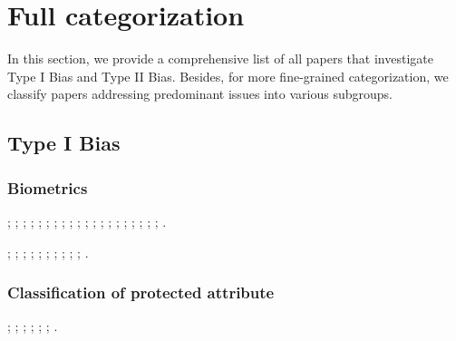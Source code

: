 \label{sec:related_work}


\section{Full categorization}
In this section, we provide a comprehensive list of all \pc papers that investigate Type I Bias and Type II Bias. 
Besides, for more fine-grained categorization, we classify papers addressing predominant issues into various subgroups.


\subsection{Type I Bias}

\subsubsection{Biometrics}
\cite{RL_RBN}; 
\cite{RFW_IMAN}; 
\cite{GAC}; 
\cite{MvCoM}; 
\cite{FPR_Penalty_Loss};
\cite{FairCal};
\cite{Asymmetric_Rejection_Loss};
\cite{inclusivefacenet};
\cite{debias_data_augmentation};
\cite{debias_balanced_AUCROC};
\cite{mcduff2019characterizing};
\cite{long2015learning};
\cite{dam};
\cite{dhar2020adversarial};
\cite{terhorst2020post};
\cite{Terhrst2020ComparisonLevelMO};
\cite{robinson2020face};
\cite{sensitive_loss};
\cite{CAT};
\cite{pahl2022female};
\cite{conti2024assessing}.




\noindent
{}
\cite{FR_inherent_bias};
\cite{pass};
\cite{DebFace};
\cite{SensitiveNets};
\cite{personalization};
\cite{class_imbalance_long_tail}; 
\cite{albiero2020face};
\cite{cavazos2020accuracy};
\cite{han2017heterogeneous};
\cite{nagpal2019deep};
\cite{FVRT3}.





\subsubsection{Classification of protected attribute}
\cite{Timnit_sex_classification_PPB}; 
\cite{transect};
\cite{Fairface};
\cite{MTCNN};
\cite{weerts2023algorithmic};
\cite{de2019does};
\cite{cruz2024unprocessing}.





